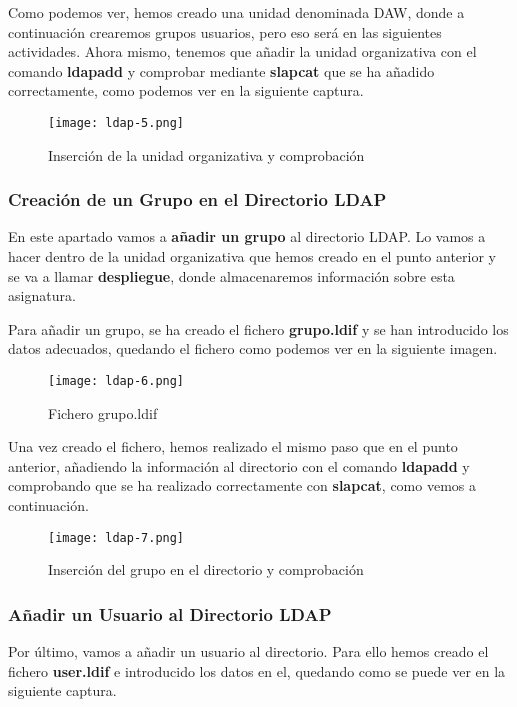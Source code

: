 Como podemos ver, hemos creado una unidad denominada DAW, donde a continuación crearemos grupos usuarios, pero eso será en las siguientes actividades. Ahora mismo, tenemos que añadir la unidad organizativa con el comando \textbf{ldapadd} y comprobar mediante \textbf{slapcat} que se ha añadido correctamente, como podemos ver en la siguiente captura.

\begin{figure}[H]
    \centering
    \texttt{[image: ldap-5.png]}
    \caption{Inserción de la unidad organizativa y comprobación}
\end{figure}

\subsubsection{Creación de un Grupo en el Directorio LDAP}
En este apartado vamos a \textbf{añadir un grupo} al directorio LDAP. Lo vamos a hacer dentro de la unidad organizativa que hemos creado en el punto anterior y se va a llamar \textbf{despliegue}, donde almacenaremos información sobre esta asignatura.

Para añadir un grupo, se ha creado el fichero \textbf{grupo.ldif} y se han introducido los datos adecuados, quedando el fichero como podemos ver en la siguiente imagen.


\begin{figure}[H]
    \centering
    \texttt{[image: ldap-6.png]}
    \caption{Fichero grupo.ldif}
\end{figure}

Una vez creado el fichero, hemos realizado el mismo paso que en el punto anterior, añadiendo la información al directorio con el comando \textbf{ldapadd} y comprobando que se ha realizado correctamente con \textbf{slapcat}, como vemos a continuación.

\begin{figure}[H]
    \centering
    \texttt{[image: ldap-7.png]}
    \caption{Inserción del grupo en el directorio y comprobación}
\end{figure}

\subsubsection{Añadir un Usuario al Directorio LDAP}
Por último, vamos a añadir un usuario al directorio. Para ello hemos creado el fichero \textbf{user.ldif} e introducido los datos en el, quedando como se puede ver en la siguiente captura.

